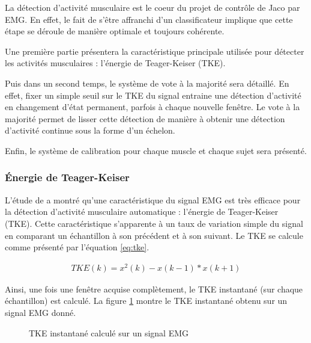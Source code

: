 \documentclass[letterpaper, twoside, 12pt, memoire, creativecommons, hyperref]{thETS}
\begin{document}
La détection d'activité musculaire est le coeur du projet de contrôle de Jaco par EMG. En effet, le fait de s'être affranchi d'un classificateur implique que cette étape se déroule de manière optimale et toujours cohérente.

Une première partie présentera la caractéristique principale utilisée pour détecter les activités musculaires : l'énergie de Teager-Keiser (TKE). 

Puis dans un second temps, le système de vote à la majorité sera détaillé. En effet, fixer un simple seuil sur le TKE du signal entraine une détection d'activité en changement d'état permanent, parfois à chaque nouvelle fenêtre. Le vote à la majorité permet de lisser cette détection de manière à obtenir une détection d'activité continue sous la forme d'un échelon.

Enfin, le système de calibration pour chaque muscle et chaque sujet sera présenté.

\subsubsection{Énergie de Teager-Keiser}

L'étude de \cite{li2007} a montré qu'une caractéristique du signal EMG est très efficace pour la détection d'activité musculaire automatique : l'énergie de Teager-Keiser (TKE). Cette caractéristique s'apparente à un taux de variation simple du signal en comparant un échantillon à son précédent et à son suivant. Le TKE se calcule comme présenté par l'équation \ref{eq:tke}.

\begin{align}\label{eq:tke}
   TKE(k) = x^2(k) - x(k-1)*x(k+1) 
\end{align}

Ainsi, une fois une fenêtre acquise complètement, le TKE instantané (sur chaque échantillon) est calculé. La figure \ref{fig:tkeinstant} montre le TKE instantané obtenu sur un signal EMG donné.

\begin{figure}
	\centering
	\caption{TKE instantané calculé sur un signal EMG}
	\label{fig:tkeinstant}
\end{figure}
\end{document}
